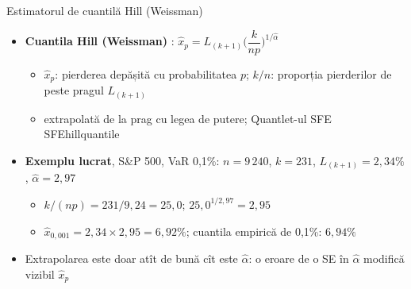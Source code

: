 \begin{frame}{Estimatorul de cuantilă Hill (Weissman)}
\itemsize{\small}
\begin{itemize}
    \item \textbf{Cuantila Hill (Weissman)} : $\hat x_p = L_{(k+1)}\Big(\dfrac{k}{n p}\Big)^{1/\hat\alpha}$
    \begin{itemize}
        \item $\hat x_p$: pierderea depășită cu probabilitatea $p$; $k/n$: proporția pierderilor de peste pragul $L_{(k+1)}$
        \item extrapolată de la prag cu legea de putere; Quantlet-ul SFE SFEhillquantile
    \end{itemize}
    \item \textbf{Exemplu lucrat}, S\&P 500, VaR 0,1\%: $n = 9\,240$, $k = 231$, $L_{(k+1)} = 2{,}34\%$, $\hat\alpha = 2{,}97$
    \begin{itemize}
        \item $k/(np) = 231/9{,}24 = 25{,}0$; $25{,}0^{1/2{,}97} = 2{,}95$
        \item $\hat x_{0{,}001} = 2{,}34 \times 2{,}95 = 6{,}92\%$; cuantila empirică de 0,1\%: $6{,}94\%$
    \end{itemize}
    \item Extrapolarea este doar atît de bună cît este $\hat\alpha$: o eroare de o SE în $\hat\alpha$ modifică vizibil $\hat x_p$
\end{itemize}
\end{frame}

